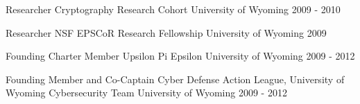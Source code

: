 


\begin{cvhonors}


\cvhonor
{Researcher} %
{Cryptography Research Cohort} %
{University of Wyoming} %
{2009 - 2010} %


\cvhonor
{Researcher} %
{NSF EPSCoR Research Fellowship} %
{University of Wyoming} %
{2009} %


\cvhonor
{Founding Charter Member} %
{Upsilon Pi Epsilon} %
{University of Wyoming} %
{2009 - 2012} %


\cvhonor
{Founding Member and Co-Captain} %
{Cyber Defense Action League, University of Wyoming Cybersecurity Team} %
{University of Wyoming} %
{2009 - 2012} %


\end{cvhonors}
